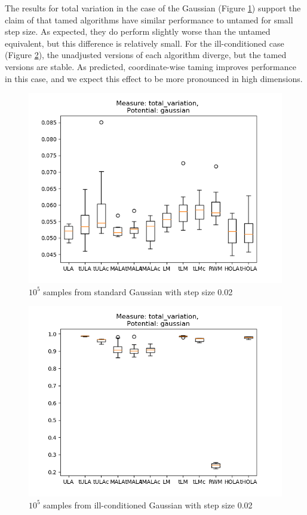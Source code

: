 The results for total variation in the case of the Gaussian (Figure \ref{fig:TVgauss}) support the claim of \cite{Brosse18tULA} that tamed algorithms have similar performance to untamed for small step size.  As expected, they do perform slightly worse than the untamed equivalent, but this difference is relatively small.  For the ill-conditioned case (Figure \ref{fig:TV_ICgauss}), the unadjusted versions of each algorithm diverge, but the tamed versions are stable.  As predicted, coordinate-wise taming improves performance in this case, and we expect this effect to be more pronounced in high dimensions.
\begin{figure}[ht!]
	\centering
		\includegraphics[height=0.43\textheight]{Figures/TV_gaussian11_step0pt02.png}
	\caption{$10^5$ samples from standard Gaussian with step size 0.02}
	\label{fig:TVgauss}
\end{figure}

\begin{figure}[ht!]
	\centering
		\includegraphics[height=0.43\textheight]{Figures/TV_ICgaussian10pt0001_step0pt02.png}
	\caption{$10^5$ samples from ill-conditioned Gaussian with step size 0.02}
	\label{fig:TV_ICgauss}
\end{figure}

